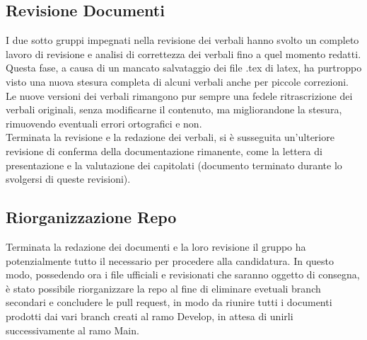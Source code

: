 \documentclass[12pt,a4paper]{article}
\begin{document}
\subsection{Revisione Documenti}
I due sotto gruppi impegnati nella revisione dei verbali hanno svolto un completo lavoro di revisione e analisi di correttezza dei verbali fino a quel momento redatti. Questa fase, a causa di un mancato salvataggio dei file .tex di latex, ha purtroppo visto una nuova stesura completa di alcuni verbali anche per piccole correzioni. Le nuove versioni dei verbali rimangono pur sempre una fedele ritrascrizione dei verbali originali, senza modificarne il contenuto, ma migliorandone la stesura, rimuovendo eventuali errori ortografici e non.\\
Terminata la revisione e la redazione dei verbali, si è susseguita un'ulteriore revisione di conferma della documentazione rimanente, come la lettera di presentazione e la valutazione dei capitolati (documento terminato durante lo svolgersi di queste revisioni).

\subsection{Riorganizzazione Repo}
Terminata la redazione dei documenti e la loro revisione il gruppo ha potenzialmente tutto il necessario per procedere alla candidatura. In questo modo, possedendo ora i file ufficiali e revisionati che saranno oggetto di consegna, è stato possibile riorganizzare la repo al fine di eliminare evetuali branch secondari e concludere le pull request, in modo da riunire tutti i documenti prodotti dai vari branch creati al ramo Develop, in attesa di unirli successivamente al ramo Main.
\end{document}

